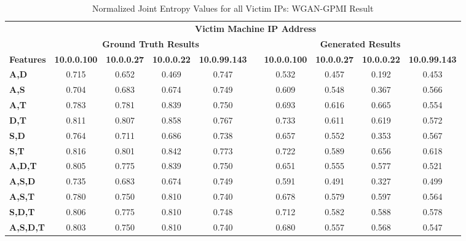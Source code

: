 \begin{table}[!htbp]
	\caption{Normalized Joint Entropy Values for all Victim IPs: WGAN-GPMI Result}
	\label{tab:je2}
	\centering
	\begin{adjustbox}{angle=90}
		\begin{tabular}{l|c|c|c|c|c|c|c|c|c|}
			\multicolumn{1}{c|}{} & \multicolumn{9}{c|}{\textbf{Victim Machine IP Address}} \\
			\multicolumn{1}{c|}{} & \multicolumn{4}{c|}{\textbf{Ground Truth Results}} &  & \multicolumn{4}{c|}{\textbf{Generated Results}} \\
			\multicolumn{1}{c|}{\textbf{Features}} & \textbf{10.0.0.100} & \textbf{10.0.0.27} & \textbf{10.0.0.22} & \textbf{10.0.99.143} &  & \textbf{10.0.0.100} & \textbf{10.0.0.27} & \textbf{10.0.0.22} & \textbf{10.0.99.143} \\ \hline
			\textbf{A,D} & 0.715 & 0.652 & 0.469 & 0.747 &  & 0.532 & 0.457 & 0.192 & 0.453 \\
			\textbf{A,S} & 0.704 & 0.683 & 0.674 & 0.749 &  & 0.609 & 0.548 & 0.367 & 0.566 \\
			\textbf{A,T} & 0.783 & 0.781 & 0.839 & 0.750 &  & 0.693 & 0.616 & 0.665 & 0.554 \\
			\textbf{D,T} & 0.811 & 0.807 & 0.858 & 0.767 &  & 0.733 & 0.611 & 0.619 & 0.572 \\
			\textbf{S,D} & 0.764 & 0.711 & 0.686 & 0.738 &  & 0.657 & 0.552 & 0.353 & 0.567 \\
			\textbf{S,T} & 0.816 & 0.801 & 0.842 & 0.773 &  & 0.722 & 0.589 & 0.656 & 0.618 \\ \hline
			\textbf{A,D,T} & 0.805 & 0.775 & 0.839 & 0.750 &  & 0.651 & 0.555 & 0.577 & 0.521 \\
			\textbf{A,S,D} & 0.735 & 0.683 & 0.674 & 0.749 &  & 0.591 & 0.491 & 0.327 & 0.499 \\
			\textbf{A,S,T} & 0.780 & 0.750 & 0.810 & 0.740 &  & 0.678 & 0.579 & 0.597 & 0.564 \\
			\textbf{S,D,T} & 0.806 & 0.775 & 0.810 & 0.748 &  & 0.712 & 0.582 & 0.588 & 0.578 \\ \hline
			\textbf{A,S,D,T} & 0.803 & 0.750 & 0.810 & 0.740 &  & 0.680 & 0.557 & 0.568 & 0.547
		\end{tabular}
	\end{adjustbox}
\end{table}


